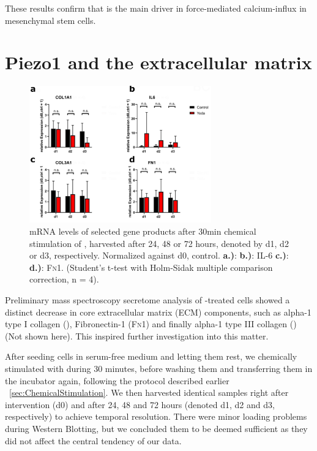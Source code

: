 These results confirm that \Piezo{} is the main driver in force-mediated calcium-influx in mesenchymal stem cells.


\section{Piezo1 and the extracellular matrix}
\label{sec:PiezoandECM}


\begin{figure}[ht]
	\centering
	\includegraphics[width = 0.7\textwidth]{NormalYodaExp_PCR.png}
	\caption{mRNA levels of selected gene products after 30min chemical stimulation of \Piezo{}, harvested after 24, 48 or 72 hours, denoted by d1, d2 or d3, respectively. Normalized against d0, control.\hfill \newline
		\textbf{a.)}: \colone{}
		\textbf{b.)}: IL-6
		\textbf{c.)}: \colthree{}
		\textbf{d.)}: \textsc{Fn}1. 
		(Student's t-test with Holm-Sidak multiple comparison correction, n = 4). 
	}
	\label{fig:Yoda_Norm_PCR}
\end{figure}




Preliminary mass spectroscopy secretome analysis of \Yoda-treated cells showed a distinct decrease in core extracellular matrix (ECM) components, such as alpha-1 type I collagen (\colone), Fibronectin-1 (\textsc{Fn1}) and finally alpha-1 type III collagen (\colthree) (Not shown here). This inspired further investigation into this matter.\par



After seeding cells in serum-free medium and letting them rest, we chemically stimulated \Piezo{} with \Yoda{} during 30 minutes, before washing them and transferring them in the incubator again, following the protocol described earlier ~\vref{sec:ChemicalStimulation}. We then harvested identical samples right after intervention (d0) and after 24, 48 and 72 hours (denoted d1, d2 and d3, respectively) to achieve temporal resolution. There were minor loading problems during Western Blotting, but we concluded them to be deemed sufficient as they did not affect the central tendency of our data. \par

